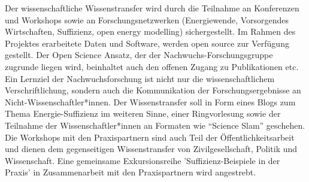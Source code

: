 \documentclass[a4paper,11pt,twoside]{scrartcl}
\begin{document}
Der wissenschaftliche Wissenstransfer wird durch die Teilnahme an Konferenzen und Workshops sowie an Forschungsnetzwerken (Energiewende, Vorsorgendes Wirtschaften, Suffizienz, open energy modelling) sichergestellt. Im Rahmen des Projektes erarbeitete Daten und Software, werden open source zur Verfügung gestellt. Der Open Science Ansatz, der der Nachwuchs-Forschungsgruppe zugrunde liegen wird, beinhaltet auch den offenen Zugang zu Publikationen etc. Ein Lernziel der Nachwuchsforschung ist nicht nur die wissenschaftlichem Verschriftlichung, sondern auch die Kommunikation der Forschungsergebnisse an Nicht-Wissenschaftler*innen. Der Wissenstransfer soll in Form eines Blogs zum Thema Energie-Suffizienz im weiteren Sinne, einer Ringvorlesung sowie der Teilnahme der Wissenschaftler*innen an Formaten wie ``Science Slam'' geschehen. Die Workshops mit den Praxispartnern sind auch Teil der Öffentlichkeitsarbeit und dienen dem gegenseitigen Wissenstransfer von Zivilgesellschaft, Politik und Wissenschaft. Eine gemeinsame Exkursionsreihe 'Suffizienz-Beispiele in der Praxis' in Zusammenarbeit mit den Praxispartnern wird angestrebt.
\end{document}

